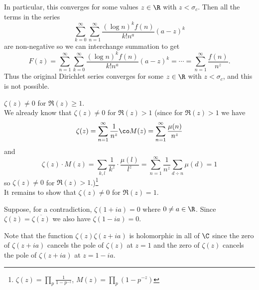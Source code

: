 In particular, this converges for some values $z\in\R$ with $z<\sigma_c$.
Then all the terms in the series
\[ \sum_{k=0}^\infty \sum_{n=1}^\infty \frac{(\log n)^kf(n)}{k!n^a} (a-z)^k \]
are non-negative
so we can interchange summation to get
\[ F(z) = \sum_{n=1}^\infty \sum_{k=0}^\infty \frac{(\log n)^k f(n)}{k!n^a} (a-z)^k = \dotsb = \sum_{n=1}^\infty \frac{f(n)}{n^z} . \]
Thus the original Dirichlet series converges for some $z\in\R$ with $z<\sigma_c$, and this is not possible.

\thm $\zeta(z)\neq0$ for $\Re(z)\geq1$. \\
\pf We already know that $\zeta(z)\neq0$ for $\Re(z)>1$ (since for $\Re(z)>1$ we have
\[ \zeta(z) = \sum_{n=1}^\infty \frac1{n^z} \co M(z) = \sum_{n=1}^\infty \frac{\mu(n)}{n^z} \]
and
\[ \zeta(z)\cdot M(z) = \sum_{k,l} \frac{1}{k^z}\cdot\frac{\mu(l)}{l^z} = \sum_{n=1}^\infty \frac{1}{n^z} \sum_{d\div n} \mu(d) = 1 \]
so $\zeta(z)\neq0$ for $\Re(z)>1$.)\footnote{$\zeta(z)=\prod_p\frac{1}{1-p^{-z}}$, $M(z)=\prod_p(1-p^{-z})$} \\
It remains to show that $\zeta(z)\neq0$ for $\Re(z)=1$.

Suppose, for a contradiction, $\zeta(1+ia)=0$ where $0\neq a\in\R$.
Since $\zeta(\overline{z})=\overline{\zeta(z)}$ we also have $\zeta(1-ia)=0$.

Note that the function $\zeta(z)\zeta(z+ia)$ is holomorphic in all of $\C$ since the zero of $\zeta(z+ia)$ cancels the pole of $\zeta(z)$ at $z=1$ and the zero of $\zeta(z)$ cancels the pole of $\zeta(z+ia)$ at $z=1-ia$.

